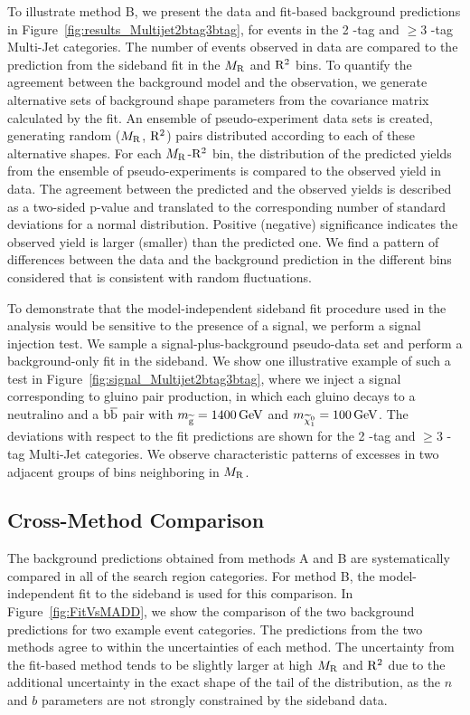 To illustrate method B, we present the data and fit-based background predictions 
in Figure~\ref{fig:results_Multijet2btag3btag}, for events in the 2 \PQb-tag and $\geq 3$ \PQb-tag 
Multi-Jet categories. The number of events observed in data are compared to the
prediction from the sideband fit in the $M_\mathrm{R}$ and $\mathrm{R}^2$ bins. To
quantify the agreement between the background model and the observation, we generate 
alternative sets of background shape parameters from the covariance matrix calculated
by the fit. An ensemble of pseudo-experiment data sets is created, generating 
random ($M_\mathrm{R}$, $\mathrm{R}^2$) pairs distributed according to each of these alternative shapes. 
For each $M_\mathrm{R}$-$\mathrm{R}^2$ bin, the distribution of the predicted yields from the
ensemble of pseudo-experiments is compared to the observed yield in data. 
The agreement between the predicted and the observed yields is described as a two-sided 
p-value and translated to the corresponding number of standard deviations for a normal
distribution. Positive (negative) significance indicates the observed
yield is larger (smaller) than the predicted one. We find a pattern of 
differences between the data and the background prediction in the different
bins considered that is consistent with random fluctuations.

To demonstrate that the model-independent sideband fit procedure
used in the analysis would be sensitive to the presence of a
signal, we perform a signal injection test. We sample a signal-plus-background 
pseudo-data set and perform a background-only fit in the sideband. We show one illustrative 
example of such a test in Figure~\ref{fig:signal_Multijet2btag3btag}, where we inject a signal 
corresponding to gluino pair production, in which each gluino decays to a neutralino and 
a $\mathrm{b}\overline{\mathrm{b}}$ pair with $m_{\widetilde{\mathrm{g}}} = 1400 \,\text{Ge\hspace{-.08em}V}$ and $m_{\widetilde{\chi}^{0}_1}=100 \,\text{Ge\hspace{-.08em}V}$. The
deviations with respect to the fit predictions are shown for the 2
\PQb-tag and $\geq 3$ \PQb-tag Multi-Jet categories. We observe characteristic patterns 
of excesses in two adjacent groups of bins neighboring in $M_\mathrm{R}$. 


\subsection{Cross-Method Comparison}

The background predictions obtained from methods A and B are systematically compared 
in all of the search region categories. For method B, the model-independent 
fit to the sideband is used for this comparison. In Figure~\ref{fig:FitVsMADD},
we show the comparison of the two background predictions for two example event categories.
The predictions from the two methods agree to within the uncertainties of each method.
The uncertainty from the fit-based method tends to be slightly larger at high
$M_\mathrm{R}$ and $\mathrm{R}^2$ due to the additional uncertainty in the exact shape of 
the tail of the distribution, as the $n$ and $b$ parameters are not strongly 
constrained by the sideband data. 

